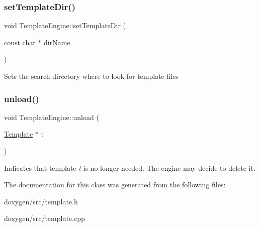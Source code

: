 \subsubsection{\texorpdfstring{setTemplateDir()}{setTemplateDir()}}
{\footnotesize\ttfamily void Template\+Engine\+::set\+Template\+Dir (\begin{DoxyParamCaption}\item[{const char $\ast$}]{dir\+Name }\end{DoxyParamCaption})}

Sets the search directory where to look for template files \mbox{\label{class_template_engine_a6050af3395989e4521969369ea7c2de0}} 
\subsubsection{\texorpdfstring{unload()}{unload()}}
{\footnotesize\ttfamily void Template\+Engine\+::unload (\begin{DoxyParamCaption}\item[{\mbox{\hyperlink{class_template}{Template}} $\ast$}]{t }\end{DoxyParamCaption})}

Indicates that template {\itshape t} is no longer needed. The engine may decide to delete it. 

The documentation for this class was generated from the following files\+:\begin{DoxyCompactItemize}
\item 
doxygen/src/template.\+h\item 
doxygen/src/template.\+cpp\end{DoxyCompactItemize}
